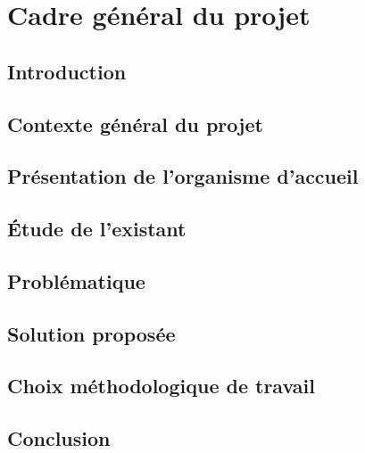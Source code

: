 \chapter{Cadre général du projet}
\renewcommand{\thesection}{\arabic{section}}
\vspace{-1cm}
\begin{justify}
    \section*{\texorpdfstring{Introduction}{Introduction}}
    
    \section{\texorpdfstring{Contexte général du projet}{Contexte général du projet}}
    
    \section{Présentation de l’organisme d’accueil}
    
    \vspace{-0.7cm}
    \section{Étude de l’existant}
         
        
    \section{Problématique}
        
    \section{Solution proposée}
        
    \section{Choix méthodologique de travail}
      
    \section*{\texorpdfstring{Conclusion}{Conclusion}}
    
\end{justify}